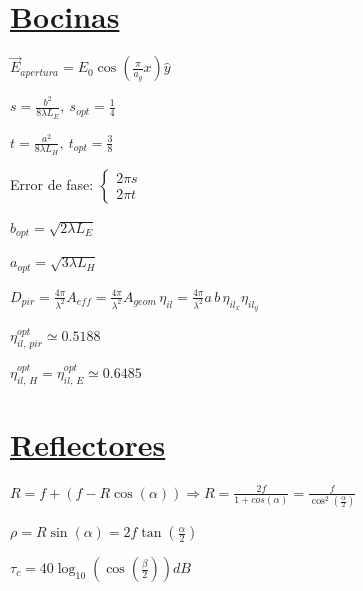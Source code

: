 \documentclass[twocolumn, 8pt]{extarticle}
\begin{document}
\vspace{0.5cm}
\section*{\underline{Bocinas}}

\( \vec{E}_{apertura} = E_0 \cos \left( \frac{\pi}{a_g}x \right) \hat{y} \)

\vspace{0.5cm}
\( s = \frac{ b^2 }{ 8\lambda L_E}, \ s_{opt} = \frac{1}{4} \)

\vspace{0.5cm}
\( t = \frac{ a^2 }{ 8\lambda L_H}, \ t_{opt} = \frac{3}{8} \)

\vspace{0.5cm}
Error de fase: \( \left \{
\begin{array}{l}
    2\pi s \\
    2\pi t
\end{array}
\right . \)

\vspace{0.5cm}
\( b_{opt} = \sqrt{ 2\lambda L_E } \)

\vspace{0.5cm}
\( a_{opt} = \sqrt{ 3\lambda L_H } \)

\vspace{0.5cm}
\( D_{pir} = \frac{ 4\pi }{ \lambda^2 } A_{eff} = \frac{ 4\pi }{ \lambda^2 } A_{geom} \, \eta_{il} = \frac{ 4\pi }{ \lambda^2 } a \, b \, \eta_{il_x} \eta_{il_y} \)

\vspace{0.5cm}
\( \eta^{opt}_{il ,\, pir} \simeq 0.5188 \)

\vspace{0.5cm}
\( \eta^{opt}_{il ,\, H} =  \eta^{opt}_{il ,\, E} \simeq 0.6485 \)

\newpage
\section*{\underline{Reflectores}}

\( R = f + (f - R\cos(\alpha)) \Rightarrow R = \frac{2f}{1 + cos(\alpha)} = \frac{f}{\cos^2\left(\frac{\alpha}{2}\right)}\)

\vspace{0.5cm}
\( \rho = R \sin(\alpha) = 2f \tan\left(\frac{\alpha}{2}\right) \)

\vspace{0.5cm}
\( \tau_c = 40\log_{10}\left(\cos\left(\frac{\beta}{2}\right)\right) dB \)
\end{document}

